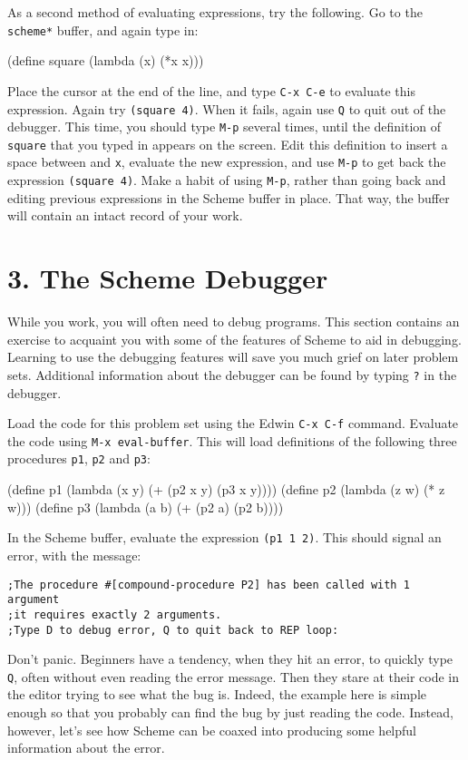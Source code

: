 As a second method of evaluating expressions, try the following.  Go
to the {\tt *scheme*} buffer, and again type in:

\beginlisp
(define square (lambda (x) (*x x)))
\endlisp

Place the cursor at the end of the line, and type {\tt C-x C-e} to
evaluate this expression.  Again try {\tt (square 4)}.  When it fails,
again use {\tt Q} to quit out of the debugger.  This time, you should
type {\tt M-p} several times, until the definition of {\tt square}
that you typed in appears on the screen.  Edit this definition to
insert a space between {\tt *} and {\tt x}, evaluate the new
expression, and use {\tt M-p} to get back the expression {\tt (square
4)}.  Make a habit of using {\tt M-p}, rather than going back and
editing previous expressions in the Scheme buffer in place.  That
way, the buffer will contain an intact record of your work.

\section{3. The Scheme Debugger}

While you work, you will often need to debug programs.  This
section contains an exercise to acquaint you with some of the features
of Scheme to aid in debugging.  Learning to use the debugging features
will save you much grief on later problem sets.  Additional
information about the debugger can be found by typing {\tt ?} in the debugger.

Load the code for this problem set using the Edwin {\tt C-x C-f}
command. Evaluate the code using {\tt M-x eval-buffer}.  This will
load definitions of the following three procedures {\tt p1}, {\tt p2}
and {\tt p3}:


\beginlisp
(define p1
  (lambda (x y)
    (+ (p2 x y)
       (p3 x y))))
\null
(define p2
  (lambda (z w)
    (* z w)))
\null
(define p3
  (lambda (a b)
    (+ (p2 a)
       (p2 b))))
\endlisp

In the Scheme buffer, evaluate the expression {\tt (p1 1 2)}.  This
should signal an error, with the message:

{\small
\begin{verbatim}
;The procedure #[compound-procedure P2] has been called with 1 argument
;it requires exactly 2 arguments.
;Type D to debug error, Q to quit back to REP loop:
\end{verbatim}
}

Don't panic.  Beginners have a tendency, when they hit an error, to
quickly type {\tt Q}, often without even reading the error message.
Then they stare at their code in the editor trying to see what the bug
is.  Indeed, the example here is simple enough so that you probably
can find the bug by just reading the code.  Instead, however, let's
see how Scheme can be coaxed into producing some helpful information
about the error.

